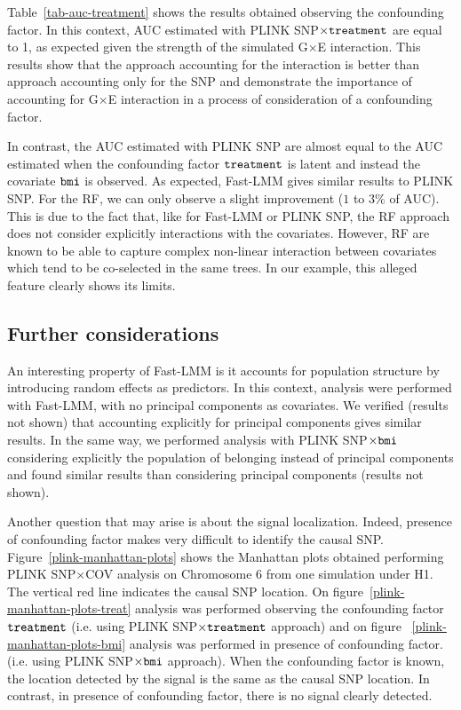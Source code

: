 \documentclass[10pt,a4paper]{article}
\begin{document}
Table~\ref{tab-auc-treatment} shows the results obtained observing the confounding factor. In this context, AUC estimated with PLINK SNP$\times \tt{treatment}$ are equal to 1, as expected given the strength of the simulated G$\times$E interaction. This results show that the approach accounting for the interaction is better than approach accounting only for the SNP and demonstrate  the importance of accounting for G$\times$E interaction in a process of consideration of a confounding factor.

In contrast, the AUC estimated with PLINK SNP are almost equal to the AUC estimated when the confounding factor $\tt{treatment}$ is latent and instead the covariate $\tt{bmi}$ is observed. As expected, Fast-LMM gives similar results to PLINK SNP. 
For the RF, we can only observe a slight improvement ($1$ to $3\%$ of AUC). This is due to the fact that, like for Fast-LMM or PLINK SNP, the RF approach does not consider explicitly interactions with the covariates. However, RF are known to be able to capture complex non-linear interaction between covariates which tend to be co-selected in the same trees. In our example, this alleged feature clearly shows its limits.


\subsection{Further considerations}


An interesting property of Fast-LMM is it accounts for population structure by introducing random effects as predictors. In this context, analysis were performed with Fast-LMM, with no principal components as covariates. We verified (results not shown) that accounting  explicitly for principal components gives similar results. In the same way, we performed analysis with PLINK SNP$\times \tt{bmi}$ considering explicitly the population of belonging instead of principal components and found similar results than considering principal components (results not shown). 

Another question that may arise is about the signal localization.  Indeed, presence of confounding factor makes very difficult to identify the causal SNP. Figure~\ref{plink-manhattan-plots} shows the Manhattan plots obtained performing PLINK SNP$\times$COV analysis on Chromosome 6 from one simulation under H1. The vertical red line indicates the causal SNP location. On figure~\ref{plink-manhattan-plots-treat} analysis was performed observing the confounding factor $\tt{treatment}$ (i.e. using PLINK SNP$\times \tt{treatment}$ approach) and on figure ~\ref{plink-manhattan-plots-bmi} analysis was performed in presence of confounding factor. (i.e. using PLINK SNP$\times \tt{bmi}$ approach). When the confounding factor is known, the location detected by the signal is the same as the causal SNP location. In contrast, in presence of confounding factor,  there is no signal clearly detected.
\end{document}
